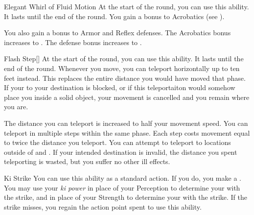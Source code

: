 {            \begin{ability}{Elegant Whirl of Fluid Motion}
                At the start of the round, you can use this ability.
                It lasts until the end of the round.
                You gain a  bonus to Acrobatics (see ).

                \rankline
                 You also gain a  bonus to Armor and Reflex defenses.
                 The Acrobatics bonus increases to .
                 The defense bonus increases to .
            \end{ability}

            \begin{ability}{Flash Step}[]
                At the start of the round, you can use this ability.
                It lasts until the end of the round.
                Whenever you move, you can teleport horizontally up to ten feet instead.
                This replaces the entire distance you would have moved that phase.
                If your  to your destination is blocked, or if this teleportaiton would somehow place you inside a solid object, your movement is cancelled and you remain where you are.

                \rankline
                 The distance you can teleport is increased to half your movement speed.
                 You can teleport in multiple steps within the same phase.
                Each step costs movement equal to twice the distance you teleport.
                 You can attempt to teleport to locations outside of  and .
                If your intended destination is invalid, the distance you spent teleporting is wasted, but you suffer no other ill effects.
            \end{ability}

            \begin{ability}{Ki Strike}
                You can use this ability as a standard action.
                If you do, you make a .
                You may use your \textit{ki power} in place of your Perception to determine your  with the strike, and in place of your Strength to determine your  with the strike.
                If the strike misses, you regain the action point spent to use this ability.


\end{ability}}

